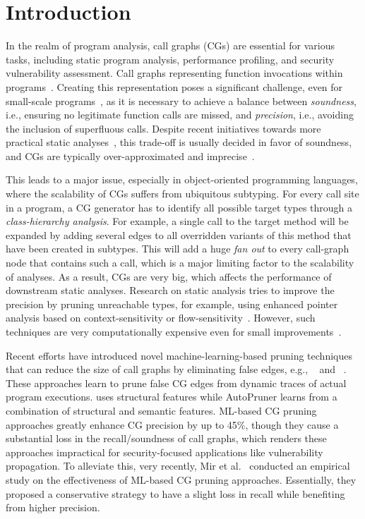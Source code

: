 \section{Introduction}
In the realm of program analysis, call graphs (CGs) are essential for various tasks, including static program analysis, performance profiling, and security vulnerability assessment.
Call graphs representing function invocations within programs~\cite{ryder1979constructing, callahan1990constructing}.
Creating this representation poses a significant challenge, even for small-scale programs~\cite{ali2012application}, as it is necessary to achieve a balance between \emph{soundness}, i.e., ensuring no legitimate function calls are missed, and \emph{precision}, i.e.,  avoiding the inclusion of superfluous calls.
Despite recent initiatives towards more practical static analyses~\cite{keshani2024frankenstein}, this trade-off is usually decided in favor of soundness, and CGs are typically over-approximated and imprecise~\cite{utture2022striking, antal2023javascript, mir2024effectiveness}.

This leads to a major issue, especially in object-oriented programming languages, where the scalability of CGs suffers from ubiquitous subtyping.
For every call site in a program, a CG generator has to identify all possible target types through a \emph{class-hierarchy analysis}.
For example, a single call to the target method  will be expanded by adding several edges to all overridden variants of this method that have been created in subtypes.
This will add a huge \emph{fan out} to every call-graph node that contains such a call, which is a major limiting factor to the scalability of analyses.
As a result, CGs are very big, which affects the performance of downstream static analyses.
Research on static analysis tries to improve the precision by pruning unreachable types, for example, using enhanced pointer analysis based on context-sensitivity or flow-sensitivity~\cite{bravenboer2009strictly, mangal2015user, tan2016making}.
However, such techniques are very computationally expensive even for small improvements~\cite{mir2023effect}.

Recent efforts have introduced novel machine-learning-based pruning techniques that can reduce the size of call graphs by eliminating false edges, e.g., ~\cite{utture2022striking} and ~\cite{le2022autopruner}.
These approaches learn to prune false CG edges from dynamic traces of actual program executions.
 uses structural features while AutoPruner learns from a combination of structural and semantic features. ML-based CG pruning approaches greatly enhance CG precision by up to 45\%, though they cause a substantial loss in the recall/soundness of call graphs, which renders these approaches impractical for security-focused applications like vulnerability propagation. To alleviate this, very recently, Mir et al.~\cite{mir2023effect} conducted an empirical study on the effectiveness of ML-based CG pruning approaches. Essentially, they proposed a conservative strategy to have a slight loss in recall while benefiting from higher precision. 

